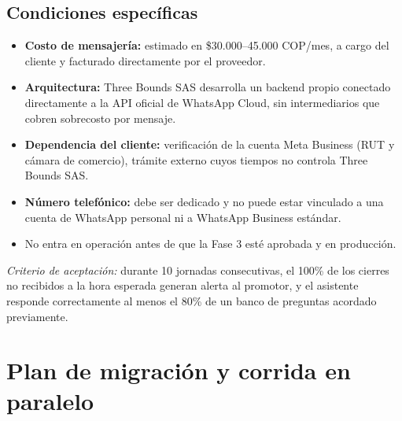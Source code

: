 \documentclass[11pt,a4paper]{article}
\begin{document}
\subsection*{Condiciones específicas}
\begin{itemize}
    \item \textbf{Costo de mensajería:} estimado en \$30.000--45.000 COP/mes, a cargo
    del cliente y facturado directamente por el proveedor.
    \item \textbf{Arquitectura:} Three Bounds SAS desarrolla un backend propio conectado
    directamente a la API oficial de WhatsApp Cloud, sin intermediarios que cobren
    sobrecosto por mensaje.
    \item \textbf{Dependencia del cliente:} verificación de la cuenta Meta Business
    (RUT y cámara de comercio), trámite externo cuyos tiempos no controla Three Bounds SAS.
    \item \textbf{Número telefónico:} debe ser dedicado y no puede estar vinculado a una
    cuenta de WhatsApp personal ni a WhatsApp Business estándar.
    \item No entra en operación antes de que la Fase 3 esté aprobada y en producción.
\end{itemize}

\noindent\textit{Criterio de aceptación:} durante 10 jornadas consecutivas, el 100\% de los
cierres no recibidos a la hora esperada generan alerta al promotor, y el asistente
responde correctamente al menos el 80\% de un banco de preguntas acordado previamente.

\section{Plan de migración y corrida en paralelo}\label{sec:migracion}

\begin{center}
\end{center}
\end{document}
